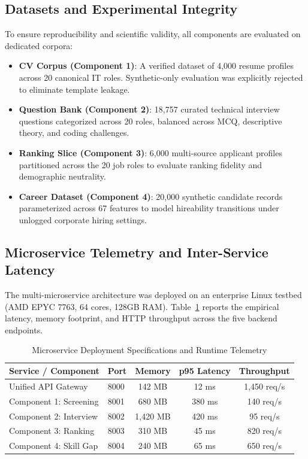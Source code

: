 \documentclass[conference]{IEEEtran}
\begin{document}
\subsection{Datasets and Experimental Integrity}
To ensure reproducibility and scientific validity, all components are evaluated on dedicated corpora:
\begin{itemize}
    \item \textbf{CV Corpus (Component 1)}: A verified dataset of 4,000 resume profiles across 20 canonical IT roles. Synthetic-only evaluation was explicitly rejected to eliminate template leakage.
    \item \textbf{Question Bank (Component 2)}: 18,757 curated technical interview questions categorized across 20 roles, balanced across MCQ, descriptive theory, and coding challenges.
    \item \textbf{Ranking Slice (Component 3)}: 6,000 multi-source applicant profiles partitioned across the 20 job roles to evaluate ranking fidelity and demographic neutrality.
    \item \textbf{Career Dataset (Component 4)}: 20,000 synthetic candidate records parameterized across 67 features to model hireability transitions under unlogged corporate hiring settings.
\end{itemize}

\subsection{Microservice Telemetry and Inter-Service Latency}
The multi-microservice architecture was deployed on an enterprise Linux testbed (AMD EPYC 7763, 64 cores, 128GB RAM). Table~\ref{tab:microservice_perf} reports the empirical latency, memory footprint, and HTTP throughput across the five backend endpoints.

\begin{table}[h]
\centering
\caption{Microservice Deployment Specifications and Runtime Telemetry}
\label{tab:microservice_perf}
\begin{tabular}{@{}llccc@{}}
\toprule
\textbf{Service / Component} & \textbf{Port} & \textbf{Memory} & \textbf{p95 Latency} & \textbf{Throughput} \\
\midrule
Unified API Gateway & 8000 & 142 MB & 12 ms & 1,450 req/s \\
Component 1: Screening & 8001 & 680 MB & 380 ms & 140 req/s \\
Component 2: Interview & 8002 & 1,420 MB & 420 ms & 95 req/s \\
Component 3: Ranking & 8003 & 310 MB & 45 ms & 820 req/s \\
Component 4: Skill Gap & 8004 & 240 MB & 65 ms & 650 req/s \\
\bottomrule
\end{tabular}
\end{table}
\end{document}
